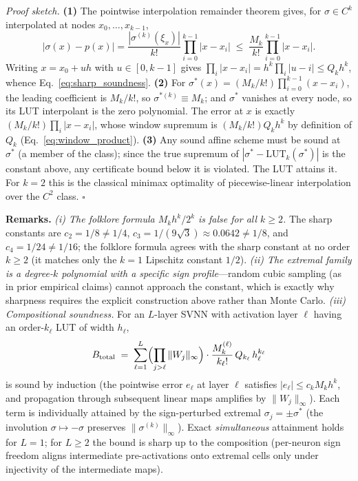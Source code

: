 \vspace{2pt}
\noindent\textit{Proof sketch.}
\textbf{(1)} The pointwise interpolation remainder theorem gives, for
$\sigma \in C^k$ interpolated at nodes $x_0, \dots, x_{k-1}$,
\begin{equation}
|\sigma(x) - p(x)| = \frac{|\sigma^{(k)}(\xi_x)|}{k!}
\prod_{i=0}^{k-1} |x - x_i|
\;\leq\; \frac{M_k}{k!} \prod_{i=0}^{k-1} |x - x_i|.
\label{eq:interp_remainder}
\end{equation}
Writing $x = x_0 + u h$ with $u \in [0, k-1]$ gives
$\prod_i |x - x_i| = h^k \prod_i |u - i| \leq Q_k h^k$, whence
Eq.~\eqref{eq:sharp_soundness}. \textbf{(2)} For
$\sigma^{*}(x) = (M_k/k!)\prod_{i=0}^{k-1}(x - x_i)$, the leading
coefficient is $M_k/k!$, so $\sigma^{*(k)} \equiv M_k$; and
$\sigma^{*}$ vanishes at every node, so its LUT interpolant is the zero
polynomial. The error at $x$ is exactly
$(M_k/k!) \prod_i |x - x_i|$, whose window supremum is
$(M_k/k!) Q_k h^k$ by definition of $Q_k$
(Eq.~\eqref{eq:window_product}). \textbf{(3)} Any sound affine scheme
must be sound at $\sigma^{*}$ (a member of the class); since the true
supremum of $|\sigma^{*} - \mathrm{LUT}_k(\sigma^{*})|$ is the constant
above, any certificate bound below it is violated. The LUT attains it.
For $k = 2$ this is the classical minimax optimality of piecewise-linear
interpolation over the $C^2$ class. $\square$

\vspace{2pt}
\noindent\textbf{Remarks.}
\textit{(i) The folklore formula $M_k h^k / 2^k$ is false for all
$k \geq 2$.} The sharp constants are $c_2 = 1/8 \neq 1/4$,
$c_3 = 1/(9\sqrt{3}) \approx 0.0642 \neq 1/8$, and
$c_4 = 1/24 \neq 1/16$; the folklore formula agrees with the sharp
constant at no order $k \geq 2$ (it matches only the $k=1$ Lipschitz
constant $1/2$).
\textit{(ii) The extremal family is a degree-$k$ polynomial with a specific
sign profile}---random cubic sampling (as in prior empirical claims) cannot
approach the constant, which is exactly why sharpness requires the explicit
construction above rather than Monte Carlo.
\textit{(iii) Compositional soundness.} For an $L$-layer SVNN with
activation layer $\ell$ having an order-$k_\ell$ LUT of width $h_\ell$,
\begin{equation}
B_{\mathrm{total}} \;=\;
\sum_{\ell=1}^{L} \Bigl( \prod_{j>\ell} \|W_j\|_\infty \Bigr)
\cdot \frac{M_k^{(\ell)}}{k_\ell!}\, Q_{k_\ell}\, h_\ell^{k_\ell}
\label{eq:sharp_compositional}
\end{equation}
is sound by induction (the pointwise error $e_\ell$ at layer $\ell$
satisfies $|e_\ell| \leq c_k M_k h^k$, and propagation through subsequent
linear maps amplifies by $\|W_j\|_\infty$). Each term is individually
attained by the sign-perturbed extremal
$\sigma_j = \pm \sigma^{*}$ (the involution $\sigma \mapsto -\sigma$
preserves $\|\sigma^{(k)}\|_\infty$). Exact \emph{simultaneous} attainment
holds for $L=1$; for $L \geq 2$ the bound is sharp up to the composition
(per-neuron sign freedom aligns intermediate pre-activations onto extremal
cells only under injectivity of the intermediate maps).

